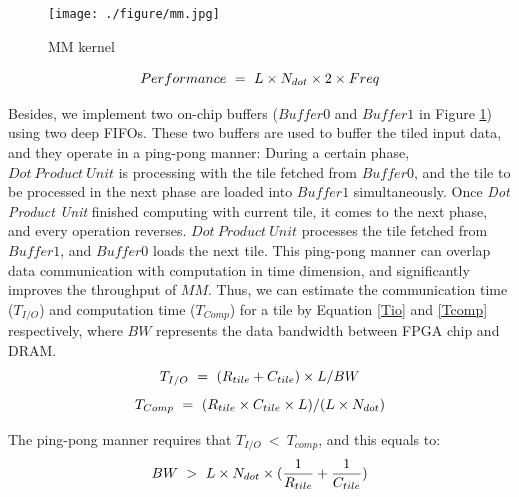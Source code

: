 \documentclass{acm_proc_article-sp-copy}
\begin{document}
\begin{figure}
	\centering
	\texttt{[image: ./figure/mm.jpg]}
	\caption{MM kernel}
	\label{mm}
\end{figure} 
\vspace{-15pt}
\begin{equation}
\centering
Performance\ =\ L \times N_{dot} \times 2  \times Freq
\label{perf} 
\end{equation}

\vspace{-10pt}Besides, we implement two on-chip buffers ($Buffer0$ and $Buffer1$ in Figure \ref{mm}) using two deep FIFOs. These two buffers are used to buffer the tiled input data, and they operate in a ping-pong manner: During a certain phase, $Dot\ Product\ Unit$ is processing with the tile fetched from $Buffer0$, and the tile to be processed in the next phase are loaded into $Buffer1$ simultaneously. Once \emph{Dot Product Unit} finished computing with current tile, it comes to the next phase, and every operation reverses. $Dot\ Product\ Unit$ processes the tile fetched from $Buffer1$, and $Buffer0$ loads the next tile. This ping-pong manner can overlap data communication with computation in time dimension, and significantly improves the throughput of $MM$. Thus, we can estimate the communication time ($T_{I/O}$) and computation time ($T_{Comp}$) for a tile by Equation \ref{Tio} and \ref{Tcomp} respectively, where $BW$ represents the data bandwidth between FPGA chip and DRAM.
\vspace{-5pt}
\begin{equation}
\centering
T_{I/O}\ =\ (R_{tile}+C_{tile})\times L/BW
\label{Tio} 
\end{equation}
\vspace{-10pt}
\begin{equation}
\centering
T_{Comp}\ =\ (R_{tile}\times C_{tile}\times L)/(L\times N_{dot})
\label{Tcomp} 
\end{equation}

\vspace{-10pt}The ping-pong manner requires that $T_{I/O}\ <\ T_{comp}$, and this equals to:
\vspace{-10pt}
\begin{equation}
\centering
BW\ >\ L\times N_{dot}\times(\dfrac{1}{R_{tile}}+\dfrac{1}{C_{tile}}) 
\end{equation}
\end{document}
